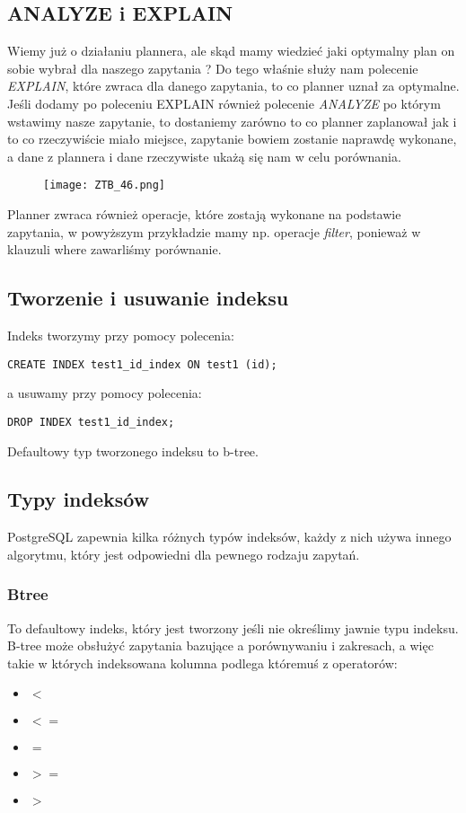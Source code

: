\documentclass[a4paper,15pt]{article}
\newcommand{\example}[2]{
    \begin{tcolorbox}[colback=blue!5!white,colframe=blue,title={Przykład #1}]
        #2
    \end{tcolorbox}
}
\begin{document}
\subsection{ANALYZE i EXPLAIN}
Wiemy już o działaniu plannera, ale skąd mamy wiedzieć jaki optymalny plan on sobie wybrał dla naszego zapytania ? Do tego właśnie służy nam polecenie \textit{EXPLAIN}, które zwraca dla danego zapytania, to co planner uznał za optymalne. \\

Jeśli dodamy po poleceniu EXPLAIN również polecenie \textit{ANALYZE} po którym wstawimy nasze zapytanie, to dostaniemy zarówno to co planner zaplanował jak i to co rzeczywiście miało miejsce, zapytanie bowiem zostanie naprawdę wykonane, a dane z plannera i dane rzeczywiste ukażą się nam w celu porównania.  

\example{}{
\begin{figure}[H]
\centering
  \texttt{[image: ZTB\_46.png]}
\end{figure}
}

Planner zwraca również operacje, które zostają wykonane na podstawie zapytania, w powyższym przykładzie mamy np. operacje \textit{filter}, ponieważ w klauzuli where zawarliśmy porównanie. 

\subsection{Tworzenie i usuwanie indeksu}

Indeks tworzymy przy pomocy polecenia:

\begin{lstlisting}
CREATE INDEX test1_id_index ON test1 (id);
\end{lstlisting}

a usuwamy przy pomocy polecenia:
\begin{lstlisting}
DROP INDEX test1_id_index;
\end{lstlisting}

Defaultowy typ tworzonego indeksu to b-tree.

\subsection{Typy indeksów}
PostgreSQL zapewnia kilka różnych typów indeksów, każdy z nich używa innego algorytmu, który jest odpowiedni dla pewnego rodzaju zapytań. 

\subsubsection{Btree}
To defaultowy indeks, który jest tworzony jeśli nie określimy jawnie typu indeksu. B-tree może obsłużyć zapytania bazujące a porównywaniu i zakresach, a więc takie w których indeksowana kolumna podlega któremuś z operatorów:
\begin{itemize}
\item $<$
\item $<=$
\item $=$
\item $>=$
\item $>$
\end{itemize}
\end{document}

